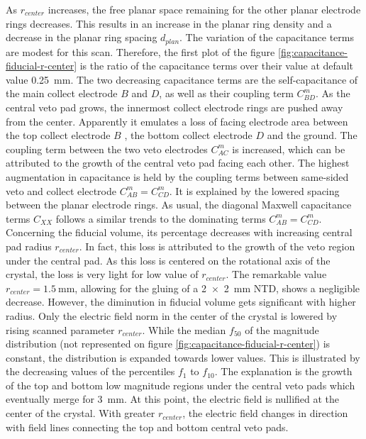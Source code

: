 As $r_{center}$ increases, the free planar space remaining for the other planar electrode rings decreases. This results in an increase in the planar ring density and a decrease in the planar ring spacing $d_{plan}$.
The variation of the capacitance terms are modest for this scan. Therefore, the first plot of the figure \ref{fig:capacitance-fiducial-r-center} is the ratio of the capacitance terms over their value at default value \SI{0.25}{\mm}. The two decreasing capacitance terms are the self-capacitance of the main collect electrode $B$ and $D$, as well as their coupling term $C_{BD}^m$. As the central veto pad grows, the innermost collect electrode rings are pushed away from the center. Apparently it emulates a loss of facing electrode area between the top collect electrode $B$ , the bottom collect electrode $D$ and the ground. The coupling term between the two veto electrodes $C_{AC}^m$ is increased, which can be attributed to the growth of the central veto pad facing each other. The highest augmentation in capacitance is held by the coupling terms between same-sided veto and collect electrode $C_{AB}^m=C_{CD}^m$. It is explained by the lowered spacing between the planar electrode rings. As usual, the diagonal Maxwell capacitance terms $C_{XX}$ follows a similar trends to the dominating terms $C_{AB}^m=C_{CD}^m$.
Concerning the fiducial volume, its percentage decreases with increasing central pad radius $r_{center}$. In fact, this loss is attributed to the growth of the veto region under the central pad. As this loss is centered on the rotational axis of the crystal, the loss is very light for low value of $r_{center}$. The remarkable value $r_{center} = \SI{1.5}{\mm}$, allowing for the gluing of a \SI{2 x 2}{\mm} NTD, shows a negligible decrease. However, the diminution in fiducial volume gets significant with higher radius.
Only the electric field norm in the center of the crystal is lowered by rising scanned parameter $r_{center}$. While the median $f_{50}$ of the magnitude distribution (not represented on figure \ref{fig:capacitance-fiducial-r-center}) is constant, the distribution is expanded towards lower values. This is illustrated by the decreasing values of the percentiles $f_{1}$ to $f_{10}$. The explanation is the growth of the top and bottom low magnitude regions under the central veto pads which eventually merge for \SI{3}{\mm}. At this point, the electric field is nullified at the center of the crystal. With greater $r_{center}$, the electric field changes in direction with field lines connecting the top and bottom central veto pads.


